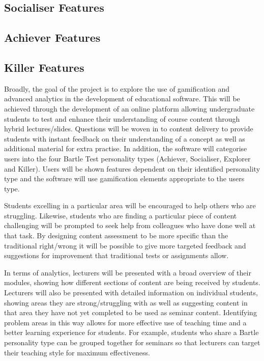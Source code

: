 \documentclass{report}
\begin{document}
\subsection*{Socialiser Features}
\subsection*{Achiever Features}
\subsection*{Killer Features}

Broadly, the goal of the project is to explore the use of gamification and advanced analytics in the development of educational software. This will be achieved through the development of an online platform allowing undergraduate students to test and enhance their understanding of course content through hybrid lectures/slides. Questions will be woven in to content delivery to provide students with instant feedback on their understanding of a concept as well as additional material for extra practise. In addition, the software will categorise users into the four Bartle Test personality types (Achiever, Socialiser, Explorer and Killer). Users will be shown features dependent on their identified personality type and the software will use gamification elements appropriate to the users type.

Students excelling in a particular area will be encouraged to help others who are struggling. Likewise, students who are finding a particular piece of content challenging will be prompted to seek help from colleagues who have done well at that task. By designing content assessment to be more specific than the traditional right/wrong it will be possible to give more targeted feedback and suggestions for improvement that traditional tests or assignments allow.

In terms of analytics, lecturers will be presented with a broad overview of their modules, showing how different sections of content are being received by students. Lecturers will also be presented with detailed information on individual students, showing areas they are strong/struggling with as well as suggesting content in that area they have not yet completed to be used as seminar content. Identifying problem areas in this way allows for more effective use of teaching time and a better learning experience for students. For example, students who share a Bartle personality type can be grouped together for seminars so that lecturers can target their teaching style for maximum effectiveness.
\end{document}

